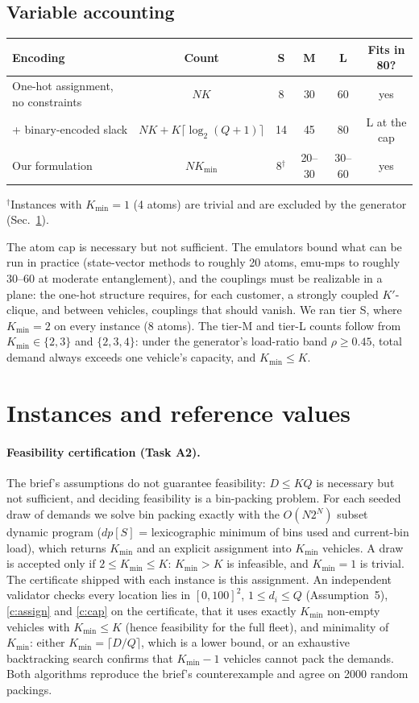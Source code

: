 \documentclass[10pt]{article}
\begin{document}
\subsection{Variable accounting}
\begin{center}
\begin{tabular}{@{}lccccc@{}}
\toprule
Encoding & Count & S & M & L & Fits in 80? \\
\midrule
One-hot assignment, no constraints & $NK$ & 8 & 30 & 60 & yes \\
+ binary-encoded slack & $NK + K\lceil \log_2(Q+1) \rceil$ & 14 & 45 & 80 & L at the cap \\
Our formulation & $NK_{\min}$ & 8$^{\dagger}$ & 20--30 & 30--60 & yes \\
\bottomrule
\end{tabular}
\end{center}
{\small $^{\dagger}$Instances with $K_{\min}=1$ (4 atoms) are trivial and are excluded by the generator (Sec.~\ref{sec:instances}).}

The atom cap is necessary but not sufficient. The emulators bound what can be run in practice
(state-vector methods to roughly 20 atoms, emu-mps to roughly 30--60 at moderate entanglement), and the
couplings must be realizable in a plane: the one-hot structure requires, for each customer, a strongly
coupled $K'$-clique, and between vehicles, couplings that should vanish.
We ran tier S, where $K_{\min}=2$ on every instance (8 atoms). The tier-M and tier-L counts follow from
$K_{\min}\in\{2,3\}$ and $\{2,3,4\}$: under the generator's load-ratio band $\rho\ge0.45$, total demand always exceeds
one vehicle's capacity, and $K_{\min}\le K$.

\section{Instances and reference values}
\label{sec:instances}
\paragraph{Feasibility certification (Task A2).} The brief's assumptions do not guarantee feasibility:
$D\le KQ$ is necessary but not sufficient, and deciding feasibility is a bin-packing problem. For each
seeded draw of demands we solve bin packing exactly with the $O(N2^N)$ subset dynamic program
($dp[S]$ = lexicographic minimum of bins used and current-bin load), which returns $K_{\min}$ and an
explicit assignment into $K_{\min}$ vehicles. A draw is accepted only if $2\le K_{\min}\le K$: $K_{\min}>K$ is
infeasible, and $K_{\min}=1$ is trivial. The certificate shipped with each instance is this assignment.
An independent validator checks every location lies in $[0,100]^2$, $1\le d_i\le Q$ (Assumption~5),
\eqref{c:assign} and \eqref{c:cap} on the certificate, that it uses exactly $K_{\min}$ non-empty vehicles with
$K_{\min}\le K$ (hence feasibility for the full fleet), and minimality of $K_{\min}$: either $K_{\min}=\lceil D/Q\rceil$,
which is a lower bound, or an exhaustive backtracking search confirms that $K_{\min}-1$ vehicles cannot pack
the demands. Both algorithms reproduce the brief's counterexample and agree on 2000 random packings.
\end{document}
